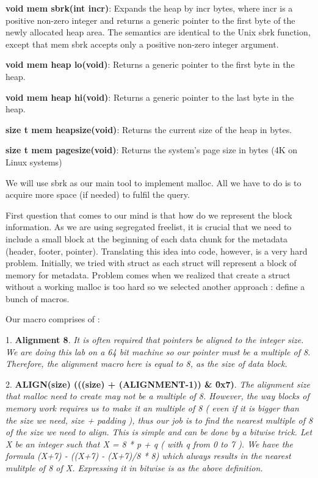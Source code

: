 \documentclass[a4paper]{article}
\begin{document}
 {\bf void \*mem sbrk(int incr)}: Expands the heap by incr bytes, where incr is a positive non-zero integer and returns a generic pointer to the first byte of the newly allocated heap area. The semantics are identical to the Unix sbrk function, except that mem sbrk accepts only a positive non-zero integer argument.  \newline  
 
  {\bf void \*mem heap lo(void)}: Returns a generic pointer to the first byte in the heap.    \newline  
  
  {\bf void \*mem heap hi(void)}: Returns a generic pointer to the last byte in the heap.  \newline  
  
   {\bf size t mem heapsize(void)}: Returns the current size of the heap in bytes.    \newline  
   
   {\bf size t mem pagesize(void)}: Returns the system’s page size in bytes (4K on Linux systems) \newline  
   

We will use sbrk as our main tool to implement malloc. All we have to do is to acquire more space (if needed) to fulfil the query.  

First question that comes to our mind is that how do we represent the block information. As we are using segregated freelist, it is crucial that we need to include a small block at the beginning of each data chunk for the metadata (header, footer, pointer). Translating this idea into code, however, is a very hard problem. Initially, we tried with struct as each struct will represent a block of memory for metadata. Problem comes when we realized that create a struct without a working malloc is too hard so we selected another approach : define a bunch of macros.  

Our macro comprises of :
\newline  

1. {\bf Alignment  8}. {\it It is often required that pointers be aligned to the integer size. We are doing this lab on a 64 bit machine so our pointer must be a multiple of 8. Therefore, the alignment macro here is equal to 8, as the size of data block. 
\newline  }

2. {\bf ALIGN(size) (((size) + (ALIGNMENT-1)) \& \~ 0x7)}. {\it       The alignment size that malloc need to create may not be a multiple of 8. However, the way blocks of memory work requires us to make it an multiple of 8 ( even if it is bigger than the size we need, size + padding ), thus our job is to find the nearest multiple of 8 of the size we need to align. This is simple and can be done by a bitwise trick. Let X be an integer such that X = 8 * p + q ( with q from 0 to 7 ). We have the formula (X+7) - ((X+7) - (X+7)/8 * 8)  which always results in the nearest mulitple of 8 of X. Expressing it in bitwise is as the above definition.}
\newline  
\end{document}
